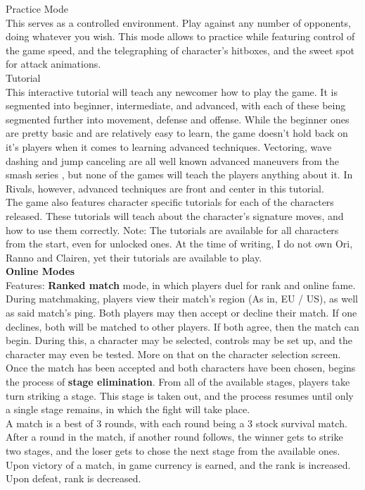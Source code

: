 \documentclass{article}
\begin{document}
Practice Mode\\
This serves as a controlled environment. Play against any number of opponents, doing whatever you wish. This mode allows to practice while featuring control of the game speed, and the telegraphing of character's hitboxes, and the sweet spot for attack animations.\\

Tutorial\\
This interactive tutorial will teach any newcomer how to play the game. It is segmented into beginner, intermediate, and advanced, with each of these being segmented further into movement, defense and offense. While the beginner ones are pretty basic and are relatively easy to learn, the game doesn't hold back on it's players when it comes to learning advanced techniques. Vectoring, wave dashing and jump canceling are all well known advanced maneuvers from the smash series \cite{atomic2017:2} \cite{manual:3}, %
but none of the games will teach the players anything about it. In Rivals, however, advanced techniques are front and center in this tutorial.\\
The game also features character specific tutorials for each of the characters released. These tutorials will teach about the character's signature moves, and how to use them correctly. Note: The tutorials are available for all characters from the start, even for unlocked ones. At the time of writing, I do not own Ori, Ranno and Clairen, yet their tutorials are available to play.\\

\textbf{Online Modes}\\
Features: \textbf{Ranked match} mode, in which players duel for rank and online fame. During matchmaking, players view their match's region (As in, EU / US), as well as said match's ping. Both players may then accept or decline their match. If one declines, both will be matched to other players. If both agree, then the match can begin. During this, a character may be selected, controls may be set up, and the character may even be tested. More on that on the character selection screen.\\
Once the match has been accepted and both characters have been chosen, begins the process of \textbf{stage elimination}. From all of the available stages, players take turn striking a stage. This stage is taken out, and the process resumes until only a single stage remains, in which the fight will take place.\\
A match is a best of 3 rounds, with each round being a 3 stock survival match. After a round in the match, if another round follows, the winner gets to strike two stages, and the loser gets to chose the next stage from the available ones.\\
Upon victory of a match, in game currency is earned, and the rank is increased. Upon defeat, rank is decreased.\\
\end{document}
